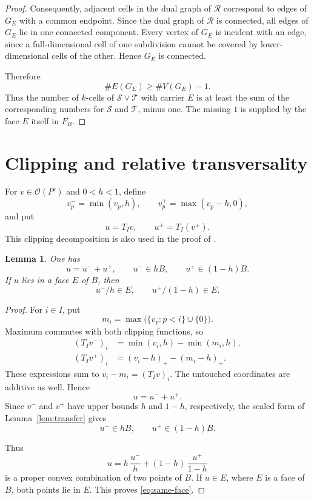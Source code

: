 \documentclass[a4paper,12pt]{amsart}
\newtheorem{lemma}[theorem]{Lemma}
\theoremstyle{definition}
\theoremstyle{remark}
\newcommand{\OO}{\mathcal O}
\begin{document}
\begin{proof}
Consequently, adjacent cells in the dual graph of $\mathcal R$ correspond to edges of $G_E$ with a common endpoint. 
Since the dual graph of $\mathcal R$ is connected, all edges of $G_E$ lie in one connected component. 
Every vertex of $G_E$ is incident with an edge, since a full-dimensional cell of one subdivision cannot be covered by lower-dimensional cells of the other. 
Hence $G_E$ is connected.

Therefore
\[
 \#E(G_E)\geq \#V(G_E)-1.
\]
Thus the number of $k$-cells of $\mathcal S\vee\mathcal T$ with carrier $E$ is at least the sum of the corresponding numbers for $\mathcal S$ and $\mathcal T$, minus one. 
The missing $1$ is supplied by the face $E$ itself in $F_B$.
\end{proof}

\section{Clipping and relative transversality}\label{sec:transversality}

For $v\in\OO(P')$ and $0<h<1$, define
\[
 v^-_p=\min(v_p,h),  \qquad  v^+_p=\max(v_p-h,0),
\]
and put
\[
 u=T_Iv,  \qquad  u^\pm=T_I(v^\pm).
\]
This clipping decomposition is also used in the proof of \cite[Proposition~15]{FFP20}.

\begin{lemma}\label{lem:clipping}
One has
\begin{equation}\label{eq:clipping}
 u=u^-+u^+,  \qquad  u^-\in hB,  \qquad  u^+\in(1-h)B.
\end{equation}
If $u$ lies in a face $E$ of $B$, then
\begin{equation}\label{eq:same-face}
 u^-/h\in E,  \qquad  u^+/(1-h)\in E.
 \end{equation}
\end{lemma}

\begin{proof}
For $i\in I$, put
\[
 m_i=\max\bigl(\{v_p:p<i\}\cup\{0\}\bigr).
\]
Maximum commutes with both clipping functions, so
\begin{align*}
 (T_Iv^-)_i  &=  \min(v_i,h)-\min(m_i,h),\\
 (T_Iv^+)_i  &=  (v_i-h)_+-(m_i-h)_+.
\end{align*}
These expressions sum to $v_i-m_i=(T_Iv)_i$. The untouched coordinates are additive as well. Hence
\[
 u=u^-+u^+.
\]
Since $v^-$ and $v^+$ have upper bounds $h$ and $1-h$, respectively, the scaled form of Lemma~\ref{lem:transfer} gives
\[
 u^-\in hB,  \qquad  u^+\in(1-h)B.
\]

Thus
\[
 u  = h\,\frac{u^-}{h} +(1-h)\,\frac{u^+}{1-h}
 \]
is a proper convex combination of two points of $B$. If $u\in E$, where $E$ is a face of $B$, both points lie in $E$. This proves
\eqref{eq:same-face}.
\end{proof}
\end{document}

